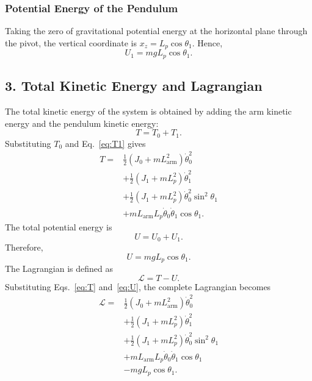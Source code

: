 \documentclass[a4paper,11pt]{article}
\newcommand{\La}{L_{\mathrm{arm}}}
\begin{document}
\subsubsection{Potential Energy of the Pendulum}
Taking the zero of gravitational potential energy at the horizontal plane through the pivot, the vertical coordinate is $x_z = L_p \cos\theta_1$. Hence,
\begin{equation}
  U_1 = m g L_p \cos\theta_1 .
\end{equation}

\subsection{3. Total Kinetic Energy and Lagrangian}
The total kinetic energy of the system is obtained by adding the arm kinetic energy and the pendulum kinetic energy:
\begin{equation}
  T = T_0 + T_1 .
\end{equation}
Substituting $T_0$ and Eq.~\eqref{eq:T1} gives
\begin{equation}
\begin{aligned}
  T = {}& \frac{1}{2}\left(J_0 + m \La^2\right)\dot\theta_0^2\\
  & + \frac{1}{2}\left(J_1 + m L_p^2\right)\dot\theta_1^2\\
  & + \frac{1}{2}\left(J_1 + m L_p^2\right)\dot\theta_0^2 \sin^2\theta_1\\
  & + m \La L_p \dot\theta_0 \dot\theta_1 \cos\theta_1 .
\end{aligned}
\label{eq:T}
\end{equation}
The total potential energy is
\begin{equation}
  U = U_0 + U_1 .
\end{equation}
Therefore,
\begin{equation}
  U = m g L_p \cos\theta_1 .
  \label{eq:U}
\end{equation}
The Lagrangian is defined as
\begin{equation}
  \mathcal{L} = T - U .
\end{equation}
Substituting Eqs.~\eqref{eq:T} and~\eqref{eq:U}, the complete Lagrangian becomes
\begin{equation}
\begin{aligned}
  \mathcal{L} = {}& \frac{1}{2}\left(J_0 + m \La^2\right)\dot\theta_0^2\\
  & + \frac{1}{2}\left(J_1 + m L_p^2\right)\dot\theta_1^2\\
  & + \frac{1}{2}\left(J_1 + m L_p^2\right)\dot\theta_0^2 \sin^2\theta_1\\
  & + m \La L_p \dot\theta_0 \dot\theta_1 \cos\theta_1\\
  & - m g L_p \cos\theta_1 .
\end{aligned}
\label{eq:Lag}
\end{equation}
\end{document}
